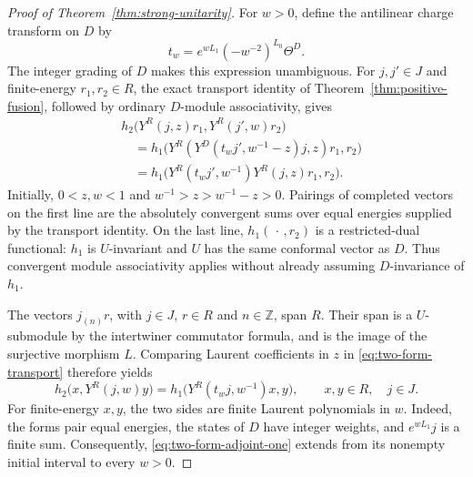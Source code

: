 \begin{proof}[Proof of Theorem~\ref{thm:strong-unitarity}]
For $w>0$, define the antilinear charge transform on $D$ by
\[
 t_w=e^{wL_1}(-w^{-2})^{L_0}\Theta^D.
\]
The integer grading of $D$ makes this expression unambiguous. For
$j,j'\in J$ and finite-energy $r_1,r_2\in R$, the exact transport
identity of Theorem~\ref{thm:positive-fusion}, followed by ordinary
$D$-module associativity, gives
\begin{equation}\label{eq:two-form-transport}
\begin{aligned}
 &h_2\bigl(Y^R(j,z)r_1,Y^R(j',w)r_2\bigr)\\
 &\quad=h_1\bigl(
 Y^R(Y^D(t_wj',w^{-1}-z)j,z)r_1,r_2\bigr)\\
 &\quad=h_1\bigl(
 Y^R(t_wj',w^{-1})Y^R(j,z)r_1,r_2\bigr).
\end{aligned}
\end{equation}
Initially, $0<z,w<1$ and $w^{-1}>z>w^{-1}-z>0$. Pairings of completed
vectors on the first line are the absolutely convergent sums over
equal energies supplied by the transport identity. On the last line,
$h_1(\,\cdot\,,r_2)$ is a restricted-dual functional: $h_1$ is
$U$-invariant and $U$ has the same conformal vector as $D$. Thus
convergent module associativity applies without already assuming
$D$-invariance of $h_1$.

The vectors $j_{(n)}r$, with $j\in J$, $r\in R$ and $n\in\mathbb Z$,
span $R$. Their span is a $U$-submodule by the intertwiner commutator
formula, and is the image of the surjective morphism $L$.
Comparing Laurent coefficients in $z$ in
\eqref{eq:two-form-transport} therefore yields
\begin{equation}\label{eq:two-form-adjoint-one}
 h_2\bigl(x,Y^R(j,w)y\bigr)
 =h_1\bigl(Y^R(t_wj,w^{-1})x,y\bigr),
 \qquad x,y\in R,\quad j\in J.
\end{equation}
For finite-energy $x,y$, the two sides are finite Laurent polynomials
in $w$. Indeed, the forms pair equal energies, the states of $D$ have
integer weights, and $e^{wL_1}j$ is a finite sum. Consequently,
\eqref{eq:two-form-adjoint-one} extends from its nonempty initial
interval to every $w>0$.


\end{proof}
